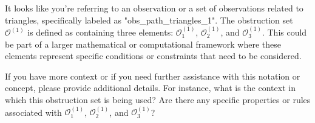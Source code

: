 It looks like you're referring to an observation or a set of observations related to triangles, specifically labeled as "obs_path_triangles_1". The obstruction set \(\mathcal{O}^{(1)}\) is defined as containing three elements: \(\mathcal{O}^{(1)}_1\), \(\mathcal{O}^{(1)}_2\), and \(\mathcal{O}^{(1)}_3\). This could be part of a larger mathematical or computational framework where these elements represent specific conditions or constraints that need to be considered.

If you have more context or if you need further assistance with this notation or concept, please provide additional details. For instance, what is the context in which this obstruction set is being used? Are there any specific properties or rules associated with \(\mathcal{O}^{(1)}_1\), \(\mathcal{O}^{(1)}_2\), and \(\mathcal{O}^{(1)}_3\)?